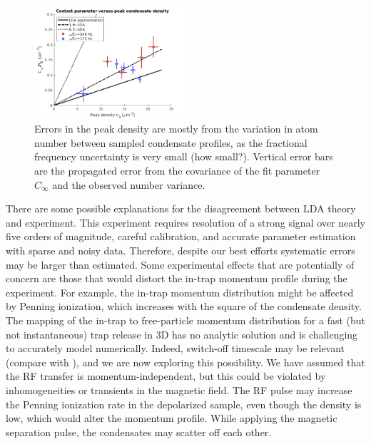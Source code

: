 \documentclass[%
	 aps,%
	 prl,%
	 a4paper,%
	 amsmath,amssymb,%
	 preprint,%
	 reprint,%
]{revtex4-1}
\begin{document}
\begin{figure}[b]
\centering
\includegraphics[width=0.5\textwidth]{final_update_freq.png}
\caption{
Errors in the peak density are mostly from the variation in atom number between sampled condensate profiles, as the fractional frequency uncertainty is very small (how small?). Vertical error bars are the propagated error from the covariance of the fit parameter $C_{\infty}$ and the observed number variance. 
}
\label{C_inf}
\end{figure}

There are some possible explanations for the disagreement between LDA theory and experiment. This experiment requires resolution of a strong signal over nearly five orders of magnitude, careful calibration, and accurate parameter estimation with sparse and noisy data. Therefore, despite our best efforts systematic errors may be larger than estimated.  Some experimental effects that are potentially of concern are those that would distort the in-trap momentum profile during the experiment. For example, the in-trap momentum distribution might be affected by Penning ionization, which increases with the square of the condensate density. The mapping of the in-trap to free-particle momentum distribution for a fast (but not instantaneous) trap release in 3D has no analytic solution 
and is challenging to accurately model numerically. Indeed, switch-off timescale may be relevant (compare \cite{Chang2016} with \cite{Qu2016}), and we are now exploring this possibility. We have assumed that the RF transfer is momentum-independent, but this could be violated by inhomogeneities or transients in the magnetic field. The RF pulse may increase the Penning ionization rate in the depolarized sample, even though the density is low, which would alter the momentum profile. While applying the magnetic separation pulse, the condensates may scatter off each other. 
\end{document}
